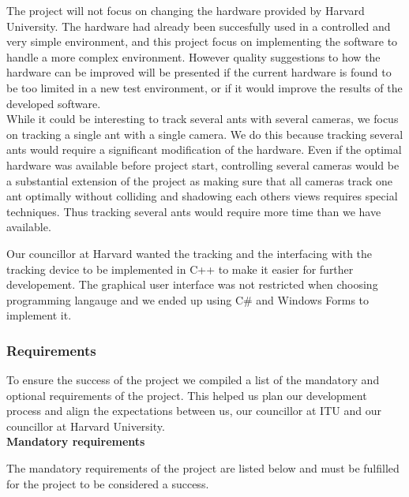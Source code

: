 The project will not focus on changing the hardware provided by Harvard University. The hardware had already been succesfully used in a controlled and very simple environment, and this project focus on implementing the software to handle a more complex environment. However quality suggestions to how the hardware can be improved will be presented if the current hardware is found to be too limited in a new test environment, or if it would improve the results of the developed software.\\

While it could be interesting to track several ants with several cameras, we focus on tracking a single ant with a single camera. We do this because tracking several ants would require a significant modification of the hardware. Even if the optimal hardware was available before project start, controlling several cameras would be a substantial extension of the project as making sure that all cameras track one ant optimally without colliding and shadowing each others views requires special techniques. Thus tracking several ants would require more time than we have available.

Our councillor at Harvard wanted the tracking and the interfacing with the tracking device to be implemented in C++ to make it easier for further developement. The graphical user interface was not restricted when choosing programming langauge and we ended up using C\# and Windows Forms to implement it.

\subsubsection{Requirements} \mbox{}\par
\label{requirements}

To ensure the success of the project we compiled a list of the mandatory and optional requirements of the project. This helped us plan our development process and align the expectations between us, our councillor at ITU and our councillor at Harvard University. \\

\noindent \textbf{Mandatory requirements} \par
The mandatory requirements of the project are listed below and must be fulfilled for the project to be considered a success.

